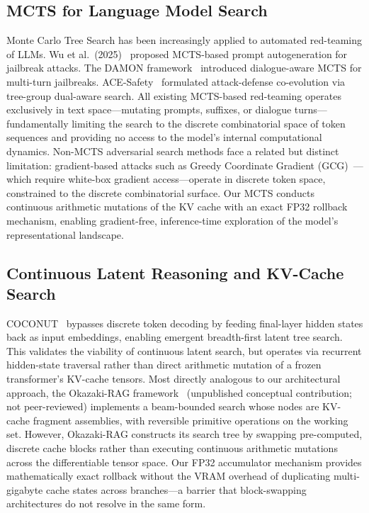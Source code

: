 \documentclass{article}
\begin{document}
\subsection{MCTS for Language Model Search}\label{sec:appendix-mcts-lm}
Monte Carlo Tree Search has been increasingly applied to automated red-teaming of LLMs. Wu et al.\ (2025)~\cite{wu2025mcts} proposed MCTS-based prompt autogeneration for jailbreak attacks. The DAMON framework~\cite{damon2025} introduced dialogue-aware MCTS for multi-turn jailbreaks. ACE-Safety~\cite{li2025ace} formulated attack-defense co-evolution via tree-group dual-aware search. All existing MCTS-based red-teaming operates exclusively in text space---mutating prompts, suffixes, or dialogue turns---fundamentally limiting the search to the discrete combinatorial space of token sequences and providing no access to the model's internal computational dynamics. Non-MCTS adversarial search methods face a related but distinct limitation: gradient-based attacks such as Greedy Coordinate Gradient (GCG)~\cite{zou2023gcg}---which require white-box gradient access---operate in discrete token space, constrained to the discrete combinatorial surface. Our MCTS conducts continuous arithmetic mutations of the KV cache with an exact FP32 rollback mechanism, enabling gradient-free, inference-time exploration of the model's representational landscape.

\subsection{Continuous Latent Reasoning and KV-Cache Search}\label{sec:appendix-continuous-latent}
COCONUT~\cite{hao2025coconut} bypasses discrete token decoding by feeding final-layer hidden states back as input embeddings, enabling emergent breadth-first latent tree search. This validates the viability of continuous latent search, but operates via recurrent hidden-state traversal rather than direct arithmetic mutation of a frozen transformer's KV-cache tensors. Most directly analogous to our architectural approach, the Okazaki-RAG framework~\cite{okazakirag2025} (unpublished conceptual contribution; not peer-reviewed) implements a beam-bounded search whose nodes are KV-cache fragment assemblies, with reversible primitive operations on the working set. However, Okazaki-RAG constructs its search tree by swapping pre-computed, discrete cache blocks rather than executing continuous arithmetic mutations across the differentiable tensor space. Our FP32 accumulator mechanism provides mathematically exact rollback without the VRAM overhead of duplicating multi-gigabyte cache states across branches---a barrier that block-swapping architectures do not resolve in the same form.
\end{document}
